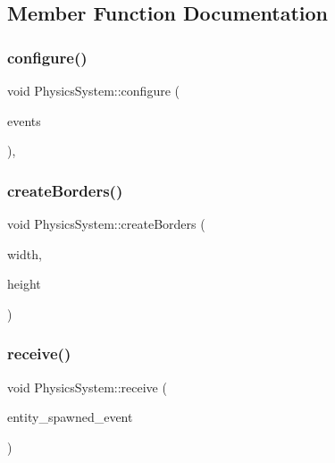 \subsection{Member Function Documentation}
\mbox{\label{classPhysicsSystem_ad5fb8504ea04b8a40146ddcb25f58861}} 
\subsubsection{\texorpdfstring{configure()}{configure()}}
{\footnotesize\ttfamily void Physics\+System\+::configure (\begin{DoxyParamCaption}\item[{ex\+::\+Event\+Manager \&}]{events }\end{DoxyParamCaption})\hspace{0.3cm}{\ttfamily [inline]}, {\ttfamily [override]}}

\mbox{\label{classPhysicsSystem_a8b42dc0a70e6da85e7dccad9897fd61c}} 
\subsubsection{\texorpdfstring{create\+Borders()}{createBorders()}}
{\footnotesize\ttfamily void Physics\+System\+::create\+Borders (\begin{DoxyParamCaption}\item[{float}]{width,  }\item[{float}]{height }\end{DoxyParamCaption})\hspace{0.3cm}{\ttfamily [inline]}}

\mbox{\label{classPhysicsSystem_a41b6f92145e580bc80e903b13b6dfaa3}} 
\subsubsection{\texorpdfstring{receive()}{receive()}\hspace{0.1cm}{\footnotesize\ttfamily [1/2]}}
{\footnotesize\ttfamily void Physics\+System\+::receive (\begin{DoxyParamCaption}\item[{const \hyperlink{classEntitySpawnedEvent}{Entity\+Spawned\+Event} \&}]{entity\+\_\+spawned\+\_\+event }\end{DoxyParamCaption})\hspace{0.3cm}{\ttfamily [inline]}}

